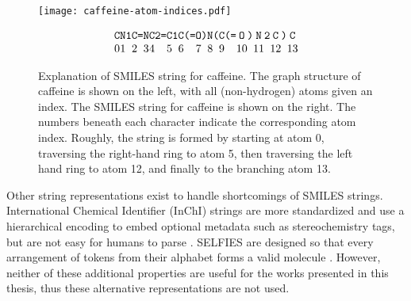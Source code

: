 \begin{figure}
    \texttt{[image: caffeine-atom-indices.pdf]}
    \begin{minipage}[b][0.4\textwidth][c]{0.55\textwidth}
        \begin{center}
            \begin{equation*}
                \setlength\arraycolsep{0pt}
                \begin{array}{cccccccccccccccccccccccccccc}
                        \texttt{C} & \texttt{N} & \texttt{1} & \texttt{C} & \texttt{=} & \texttt{N} & \texttt{C} & \texttt{2} & \texttt{=} & \texttt{C} & \texttt{1} & \texttt{C} & \texttt{(} & \texttt{=} & \texttt{O} & \texttt{)} & \texttt{N} & \texttt{(} & \texttt{C} & \texttt{(} & \texttt{=} & \texttt{O} & \texttt{)} & \texttt{N} & \texttt{2} & \texttt{C} & \texttt{)} & \texttt{C} \\
                        0          &      1     &            &          2 &            &          3 &     4      &            &            & 5          &            & 6          &            &            & 7          &            & 8          &            &       9    &            &            &     10     &            & 11         &            &  12        &            & 13
                    \end{array}
            \end{equation*}
        \end{center}
    \end{minipage}
    \caption[Explanation of SMILES string for caffeine]{
        Explanation of SMILES string for caffeine.
        The graph structure of caffeine is shown on the left, with all (non-hydrogen) atoms given an index.
        The SMILES string for caffeine is shown on the right.
        The numbers beneath each character indicate the corresponding atom index.
        Roughly, the string is formed by starting at atom $0$, traversing the right-hand ring to atom 5,
        then traversing the left hand ring to atom 12, and finally to the branching atom 13.
    }
    \label{fig:smiles-example}
\end{figure}

Other string representations exist to handle shortcomings of SMILES strings.
International Chemical Identifier (InChI) strings are more standardized
and use a hierarchical encoding to embed optional metadata such as stereochemistry tags,
but are not easy for humans to parse \citep{heller2015inchi}.
SELFIES are designed so that every arrangement of tokens from their alphabet forms a valid molecule
\citep{krenn2020self,krenn2022selfies}.
However, neither of these additional properties are useful for the works presented in this thesis,
thus these alternative representations are not used.

